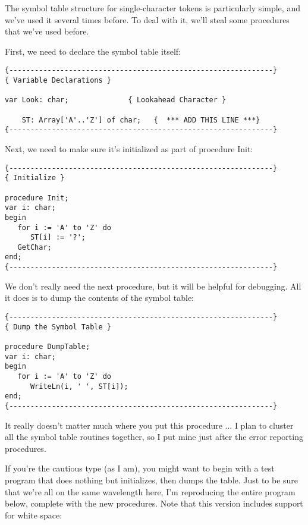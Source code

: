 The  symbol  table   structure  for  single-character  tokens  is particularly simple, and we've used  it several times before. To deal with it, we'll steal some procedures that we've used before.

First, we need to declare the symbol table itself:

\begin{verbatim}
{--------------------------------------------------------------}
{ Variable Declarations }

var Look: char;              { Lookahead Character }

    ST: Array['A'..'Z'] of char;   {  *** ADD THIS LINE ***}
{--------------------------------------------------------------}
\end{verbatim}

Next, we need to make sure it's initialized as part  of procedure Init:

\begin{verbatim}
{--------------------------------------------------------------}
{ Initialize }

procedure Init;
var i: char;
begin
   for i := 'A' to 'Z' do
      ST[i] := '?';
   GetChar;
end;
{--------------------------------------------------------------}
\end{verbatim}

We don't really need  the  next procedure, but it will be helpful for debugging. All it does is to dump the contents of the symbol table:

\begin{verbatim}
{--------------------------------------------------------------}
{ Dump the Symbol Table }

procedure DumpTable;
var i: char;
begin
   for i := 'A' to 'Z' do
      WriteLn(i, ' ', ST[i]);
end;
{--------------------------------------------------------------}
\end{verbatim}

It really doesn't matter much where you put this procedure  ... I plan to cluster all the symbol table routines together, so  I put mine just after the error reporting procedures.

If  you're  the  cautious type (as I am), you might want to begin with a test program that does nothing but initializes, then dumps the table. Just to be sure that we're all on the same wavelength here, I'm reproducing the entire program below, complete with the new  procedures. Note that this  version  includes  support  for white space:

